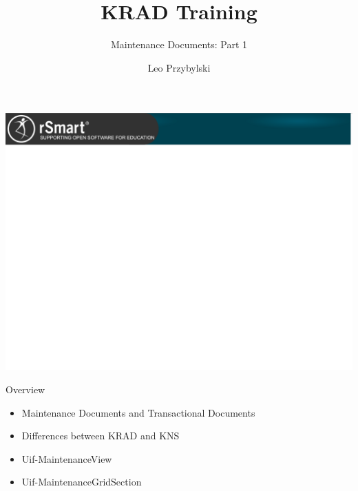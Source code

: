 \documentclass[xcolor=dvipsnames,14pt,professionalfonts]{beamer}
\begin{document}
\title{KRAD Training}
\subtitle{Maintenance Documents: Part 1}
\author[Leo]{Leo Przybylski}

\usebackgroundtemplate%
{%
    \includegraphics[width=\paperwidth,height=\paperheight]{../img/header.png}%
}

{
%
\begin{frame}[plain]
  \titlepage
\end{frame}
}

\begin{frame}{Overview}
  \begin{itemize}
  \item Maintenance Documents and Transactional Documents
  \item Differences between KRAD and KNS
  \item Uif-MaintenanceView
  \item Uif-MaintenanceGridSection
  \end{itemize}
\end{frame}
\end{document}

